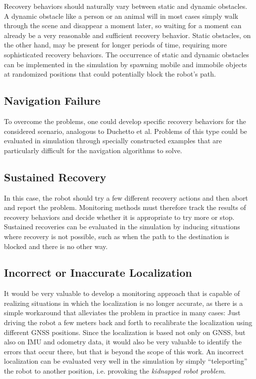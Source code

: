 \documentclass[english, master, utf8]{base/thesis_KBS}
\begin{document}
Recovery behaviors should naturally vary between static and dynamic obstacles. A dynamic obstacle like a person or an animal will in most cases 
simply walk through the scene and disappear a moment later, so waiting for a moment can already be a very reasonable and sufficient recovery behavior. 
Static obstacles, on the other hand, may be present for longer  periods of time, requiring more sophisticated recovery behaviors.\newline
The occurrence of static and dynamic obstacles can be implemented in the simulation by spawning mobile and immobile objects at randomized 
positions that could potentially block the robot's path.

\subsection{Navigation Failure}
\label{sec:sim_and_mon_navigation_failures}

To overcome the problems, one could develop specific recovery behaviors for the considered scenario, analogous to Duchetto et al.\newline
Problems of this type could be evaluated in simulation through specially constructed examples that are particularly difficult for the navigation algorithms to solve.

\subsection{Sustained Recovery}
\label{sec:sim_and_mon_sustained_recovery}

In this case, the robot should try a few different recovery actions and then abort and report the problem. Monitoring methods must therefore track the results of recovery
behaviors and decide whether it is appropriate to try more or stop.\newline
Sustained recoveries can be evaluated in the simulation by inducing situations where recovery is not possible, such as when the path to the destination is
blocked and there is no other way.

\subsection{Incorrect or Inaccurate Localization}
\label{sec:sim_and_mon_incorrect_localization}

It would be very valuable to develop a monitoring approach that is capable of realizing situations in which the localization is no longer accurate, as there is a 
simple workaround that alleviates the problem in practice in many cases: Just driving the robot a few meters back and forth to recalibrate the localization
using different GNSS positions. Since the localization is based not only on GNSS, but also on IMU and odometry data, it would also be very valuable to identify
the errors that occur there, but that is beyond the scope of this work.\newline
An incorrect localization can be evaluated very well in the simulation by simply ``teleporting'' the robot to another position, i.e. provoking the
\textit{kidnapped robot problem}.
\end{document}
